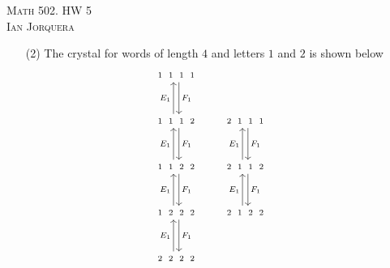 \documentclass[12pt]{amsart}
\theoremstyle{definition}
\begin{document}
\begin{center}
    \textsc{Math 502. HW 5\\ Ian Jorquera}
\end{center}
\vspace{1em}

\begin{itemize}

\item[(2)] The crystal for words of length $4$ and letters $1$ and $2$ is shown below
\[\begin{tikzcd}[row sep=1cm, column sep=.65cm]
     \begin{smallmatrix}1&1&1&1\end{smallmatrix}\arrow[d, "F_1", shift left]\\
     \begin{smallmatrix}1&1&1&2\end{smallmatrix}\arrow[d, "F_1", shift left]\arrow[u, "E_1", shift left]\\
     \begin{smallmatrix}1&1&2&2\end{smallmatrix}\arrow[d, "F_1", shift left]\arrow[u, "E_1", shift left]\\
     \begin{smallmatrix}1&2&2&2\end{smallmatrix}\arrow[d, "F_1", shift left]\arrow[u, "E_1", shift left]\\
     \begin{smallmatrix}2&2&2&2\end{smallmatrix}\arrow[u, "E_1", shift left]\\
    \end{tikzcd}\;\;\;\;\;\;
    \begin{tikzcd}[row sep=1cm, column sep=.65cm]
     \begin{smallmatrix}2&1&1&1\end{smallmatrix}\arrow[d, "F_1", shift left]\\
     \begin{smallmatrix}2&1&1&2\end{smallmatrix}\arrow[d, "F_1", shift left]\arrow[u, "E_1", shift left]\\
     \begin{smallmatrix}2&1&2&2\end{smallmatrix}\arrow[u, "E_1", shift left]\\
    \end{tikzcd}\;\;\;\;\;\;
\]
\end{itemize}
\end{document}
